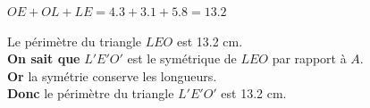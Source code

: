 \documentclass[12pt,a4paper]{article}
\begin{document}
	\noindent $OE + OL + LE = \num{4.3} + \num{3.1} + \num{5.8} = \num{13.2}$
	
	\noindent Le périmètre du triangle $LEO$ est \num{13.2} cm.\\
	
	\noindent \textbf{On sait que} $L'E'O'$ est le symétrique de $LEO$ par rapport à $A$.\\
	\textbf{Or} la symétrie conserve les longueurs.\\
	\textbf{Donc} le périmètre du triangle $L'E'O'$ est \num{13.2} cm.
\end{document}
